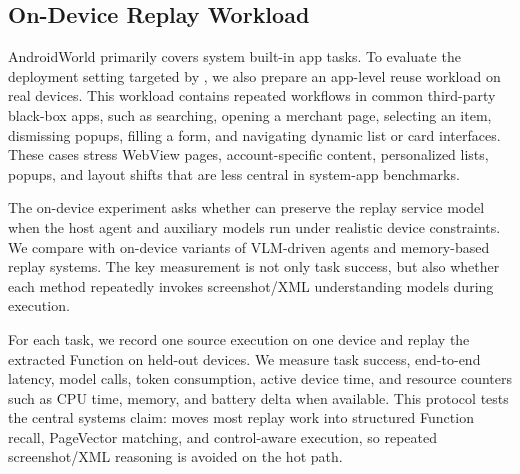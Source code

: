 \subsection{On-Device Replay Workload}
\label{sec:eval-on-device}

AndroidWorld primarily covers system built-in app tasks. To evaluate the deployment setting targeted by \sysname, we also prepare an app-level reuse workload on real devices. This workload contains repeated workflows in common third-party black-box apps, such as searching, opening a merchant page, selecting an item, dismissing popups, filling a form, and navigating dynamic list or card interfaces. These cases stress WebView pages, account-specific content, personalized lists, popups, and layout shifts that are less central in system-app benchmarks.

The on-device experiment asks whether \sysname can preserve the replay service model when the host agent and auxiliary models run under realistic device constraints. We compare \sysname with on-device variants of VLM-driven agents and memory-based replay systems. The key measurement is not only task success, but also whether each method repeatedly invokes screenshot/XML understanding models during execution.

\begin{table}[t]
  \centering
  \caption{Device pool for on-device replay evaluation.}
  \label{tab:on-device-pool}
\end{table}

For each task, we record one source execution on one device and replay the extracted Function on held-out devices. We measure task success, end-to-end latency, model calls, token consumption, active device time, and resource counters such as CPU time, memory, and battery delta when available. This protocol tests the central systems claim: \sysname moves most replay work into structured Function recall, PageVector matching, and control-aware execution, so repeated screenshot/XML reasoning is avoided on the hot path.

